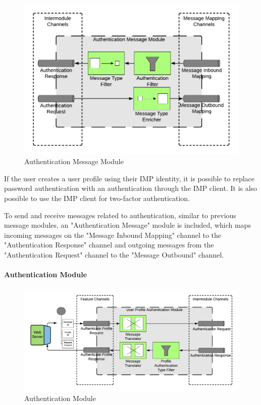 \begin{figure}[h!]
    \centering
    \includegraphics[scale=0.6]{Diagrams/Integration Architecture 1/Technological Integration/16. Authenticatin Message Module.pdf}
    \caption{Authentication Message Module}
    \label{integration1:authentication_message_module}
\end{figure}

If the user creates a user profile using their IMP identity, it is possible to replace password authentication with an authentication through the IMP client. It is also possible to use the IMP client for two-factor authentication.

To send and receive messages related to authentication, similar to previous message modules, an "Authentication Message" module is included, which maps incoming messages on the "Message Inbound Mapping" channel to the "Authentication Response" channel and outgoing messages from the "Authentication Request" channel to the "Message Outbound" channel.

\paragraph{Authentication Module}

\begin{figure}[h!]
    \centering
    \includegraphics[scale=0.6]{Diagrams/Integration Architecture 1/Technological Integration/17. Authentication.pdf}
    \caption{Authentication Module}
    \label{integration1:authentication_module}
\end{figure}

